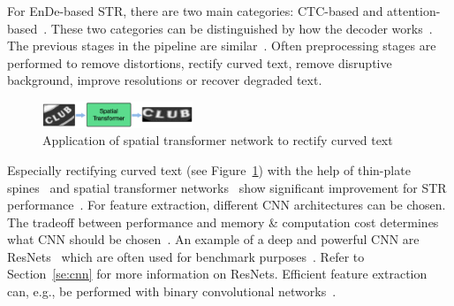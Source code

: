 For \ac{EnDe}-based \ac{STR}, there are two main categories: \ac{CTC}-based and
attention-based~\citep{chen_text_2021}.
These two categories can be distinguished by how the decoder works~\citep{chen_text_2021}.
The previous stages in the pipeline are similar~\citep{long_scene_2021,chen_text_2021}.
Often preprocessing stages are performed to remove distortions, rectify curved text,
remove disruptive background, improve resolutions or recover degraded text.
\begin{figure}[h]
    \centering
    \includegraphics[width=0.4\textwidth]{img/STN-result-Liu-STAR-2016.png}
    \caption[Text rectification application]{%
        Application of spatial transformer network to rectify curved
        text~\citep{liu_star-net_2016}\label{fig:STN-application}
    }
\end{figure}
Especially rectifying curved text (see Figure~\ref{fig:STN-application}) with the help of
thin-plate spines~\citep{bookstein_principal_1989} and spatial transformer
networks~\citep{jaderberg_spatial_2015} show significant improvement for \ac{STR}
performance~\citep{long_scene_2021,chen_text_2021}.
For feature extraction, different \ac{CNN} architectures can be chosen.
The tradeoff between performance and memory \& computation cost determines what \ac{CNN} should be
chosen~\citep{chen_text_2021}.
An example of a deep and powerful \ac{CNN} are ResNets~\citep{he_deep_2015} which are often used
for benchmark purposes~\citep{chen_text_2021,long_scene_2021}.
Refer to Section~\ref{se:cnn} for more information on ResNets.
Efficient feature extraction can, e.g., be performed with binary convolutional
networks~\citep{liu_squeezedtext_2018}.

